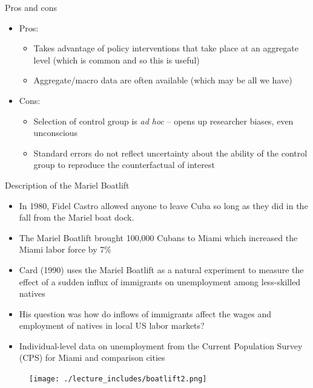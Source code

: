 \documentclass{beamer}
\begin{document}
\begin{frame}{Pros and cons}
	
	\begin{itemize}
	\item Pros:
		\begin{itemize}
		\item Takes advantage of policy interventions that take place at an aggregate level (which is common and so this is useful)
		\item Aggregate/macro data are often available (which may be all we have)
		\end{itemize}
	\item Cons:
		\begin{itemize}
		\item Selection of control group is \emph{ad hoc} -- opens up researcher biases, even unconscious
		\item Standard errors do not reflect uncertainty about the ability of the control group to reproduce the counterfactual of interest
		\end{itemize}
	\end{itemize}
\end{frame}

\begin{frame}{Description of the Mariel Boatlift}
	
	\begin{itemize}
	\item In 1980, Fidel Castro allowed anyone to leave Cuba so long as they did in the fall from the Mariel boat dock.
	\item The Mariel Boatlift brought 100,000 Cubans to Miami which increased the Miami labor force by 7\%
	\item Card (1990) uses the Mariel Boatlift as a natural experiment to measure the effect of a sudden influx of immigrants on unemployment among less-skilled natives
	\item His question was how do inflows of immigrants affect the wages and employment of natives in local US labor markets?
	\item Individual-level data on unemployment from the Current Population Survey (CPS) for Miami and comparison cities
	\end{itemize}
\end{frame}


\begin{frame}[plain]
	\begin{figure}
	\texttt{[image: ./lecture\_includes/boatlift2.png]}
	\end{figure}
\end{frame}
\end{document}
